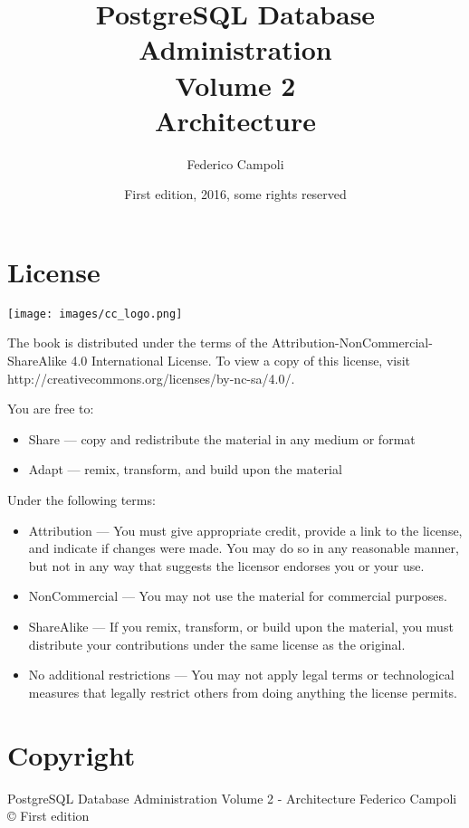 \documentclass[twoside]{book}
\author{Federico Campoli}
\title{PostgreSQL Database Administration \\ Volume 2 \\ Architecture}
\date{First edition, 2016, some rights reserved}
\begin{document}

\maketitle



\chapter*{License}
\begin{center}
 \texttt{[image: images/cc\_logo.png]}
\end{center}

The book is distributed under the terms of the Attribution-NonCommercial-ShareAlike 4.0 International 
License. To view a copy of this license, visit http://creativecommons.org/licenses/by-nc-sa/4.0/.\newline


You are free to:
\begin{itemize}
 
\item     Share — copy and redistribute the material in any medium or format
\item     Adapt — remix, transform, and build upon the material

\end{itemize}


Under the following terms:
\begin{itemize}
\item    Attribution — You must give appropriate credit, provide a link to the license, and indicate if 
changes were made. You may do so in any reasonable manner, but not in any way that suggests the licensor 
endorses you or your use.

\item    NonCommercial — You may not use the material for commercial purposes.

\item    ShareAlike — If you remix, transform, or build upon the material, you must distribute your 
contributions under the same license as the original.

\item    No additional restrictions — You may not apply legal terms or technological measures that legally 
restrict others from doing anything the license permits.

\end{itemize}

\chapter*{Copyright}
PostgreSQL Database Administration Volume 2 - Architecture\newline
Federico Campoli \copyright {} \newline
First edition\newline
\end{document}
